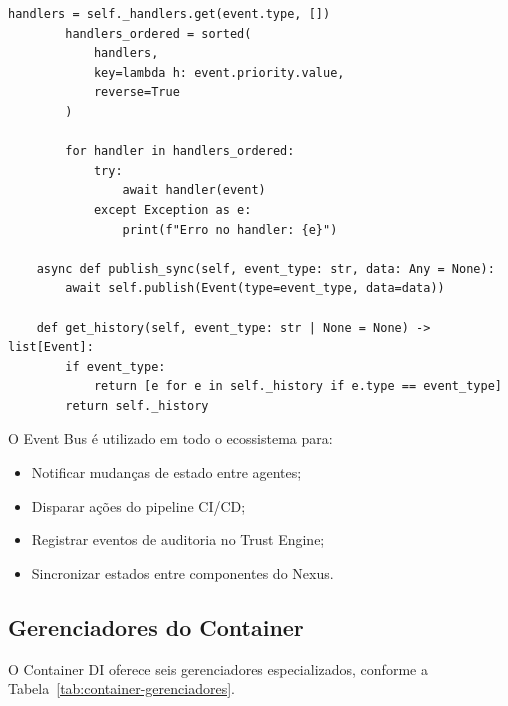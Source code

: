 \begin{lstlisting}[style=pythonstyle, caption={Event Bus assincrono},
                   label={lst:event-bus}]
        handlers = self._handlers.get(event.type, [])
        handlers_ordered = sorted(
            handlers,
            key=lambda h: event.priority.value,
            reverse=True
        )

        for handler in handlers_ordered:
            try:
                await handler(event)
            except Exception as e:
                print(f"Erro no handler: {e}")

    async def publish_sync(self, event_type: str, data: Any = None):
        await self.publish(Event(type=event_type, data=data))

    def get_history(self, event_type: str | None = None) -> list[Event]:
        if event_type:
            return [e for e in self._history if e.type == event_type]
        return self._history
\end{lstlisting}

O Event Bus é utilizado em todo o ecossistema para:
\begin{itemize}
\item Notificar mudanças de estado entre agentes;
\item Disparar ações do pipeline CI/CD;
\item Registrar eventos de auditoria no Trust Engine;
\item Sincronizar estados entre componentes do Nexus.
\end{itemize}

\subsection{Gerenciadores do Container}
\label{subsec:container-gerenciadores}

O Container DI oferece seis gerenciadores especializados, conforme a
Tabela~\ref{tab:container-gerenciadores}.

\begin{table}[htb]
\centering
    \small
\caption{Gerenciadores do Container DI}
\label{tab:container-gerenciadores}
\end{table}

